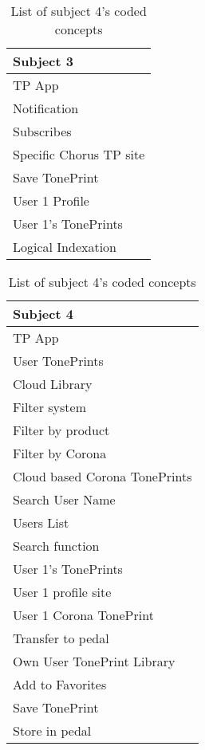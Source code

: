 \begin{table}[H]
\begin{minipage}[b]{0.5\linewidth}
    \begin{tabular}{|l|}
    \hline
    Subject 3 \\ \hline
    TP App \\
    Notification  \\
    Subscribes  \\
    Specific Chorus TP site \\
    Save TonePrint \\
    User 1 Profile \\
    User 1's TonePrints \\
    Logical Indexation  \\ \hline
    \end{tabular}
	\caption{List of subject 3's coded concepts}
    \label{tab:Subject3Coded}
    
\end{minipage}
\begin{minipage}[b]{0.49\linewidth}\centering

    \begin{tabular}{|l|}
    \hline
    Subject 4 \\ \hline
    TP App \\
    User TonePrints \\
    Cloud Library \\
    Filter system \\
    Filter by product \\
    Filter by Corona \\
    Cloud based Corona TonePrints \\
    Search User Name \\
    Users List \\
    Search function \\
    User 1's TonePrints \\
    User 1 profile site \\
    User 1 Corona TonePrint \\
    Transfer to pedal \\
    Own User TonePrint Library \\
    Add to Favorites \\
    Save TonePrint \\
    Store in pedal  \\ \hline
    \end{tabular}
	\caption{List of subject 4's coded concepts}
    \label{tab:Subject4Coded}    
    

\end{minipage}
\end{table}
